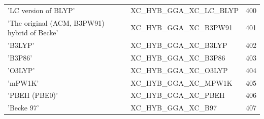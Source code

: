 \documentclass[final,12pt,makeidx,DIV=calc]{article}
\begin{document}
{{{\begin{table}[!h]
\begin{center}
\begin{tabular}{llr}
  'LC version of BLYP' & XC\_HYB\_GGA\_XC\_LC\_BLYP  &400\\
  'The original (ACM, B3PW91) hybrid of Becke' & XC\_HYB\_GGA\_XC\_B3PW91  &401\\
  'B3LYP' & XC\_HYB\_GGA\_XC\_B3LYP  &402\\
  'B3P86' & XC\_HYB\_GGA\_XC\_B3P86  &403\\
  'O3LYP' & XC\_HYB\_GGA\_XC\_O3LYP  &404\\
  'mPW1K' & XC\_HYB\_GGA\_XC\_MPW1K  &405\\
  'PBEH (PBE0)' & XC\_HYB\_GGA\_XC\_PBEH  &406\\
  'Becke 97' & XC\_HYB\_GGA\_XC\_B97  &407\\
\hline
\hline
\end{tabular}
\end{center}
\end{table}

}}}
\end{document}
